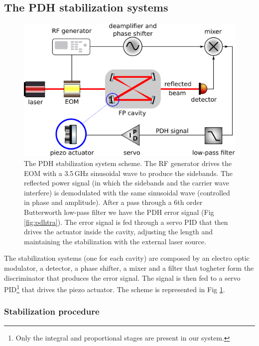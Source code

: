 \subsection{The PDH stabilization systems}
\begin{figure}
	\centering
	\includegraphics[width=1\linewidth]{images/pdh.eps}
	\caption{The PDH stabilization system scheme. The RF generator drives the EOM with a 3.5\,GHz sinusoidal wave to produce the sidebands. The reflected power signal (in which the sidebands and the carrier wave interfere) is demodulated with the same sinusoidal wave (controlled in phase and amplitude). After a pass through a 6th order Butterworth low-pass filter we have the PDH error signal (Fig \ref{fig:pdhtra}). The error signal is fed through a servo PID that then drives the actuator inside the cavity, adjusting the length and maintaining the stabilization with the external laser source.}
	\label{fig:pdh}
\end{figure}
The stabilization systems (one for each cavity) are composed by an electro optic modulator, a detector, a phase shifter, a mixer and a filter that togheter form the discriminator that produces the error signal. The signal is then fed to a servo PID\footnote{Only the integral and proportional stages are present in our system.} that drives the piezo actuator. The scheme is represented in Fig \ref{fig:pdh}.

\subsubsection{Stabilization procedure}

